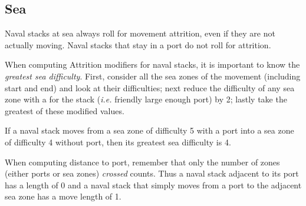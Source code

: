 \subsection{Sea}
Naval stacks at sea always roll for movement attrition, even if they are not
actually moving. Naval stacks that stay in a port do not roll for attrition.

When computing Attrition modifiers for naval stacks, it is important to know
the \emph{greatest sea difficulty}. First, consider all the sea zones of the
movement (including start and end) and look at their difficulties; next reduce
the difficulty of any sea zone with a \SoS for the stack (\emph{i.e.} friendly
large enough port) by 2; lastly take the greatest of these modified values.

\begin{exemple}
  If a naval stack moves from a sea zone of difficulty 5 with a port into a
  sea zone of difficulty 4 without port, then its greatest sea difficulty is
  4.
\end{exemple}

When computing distance to port, remember that only the number of zones
(either ports or sea zones) \emph{crossed} counts. Thus a naval stack adjacent
to its port has a \LoS length of 0 and a naval stack that simply moves from a
port to the adjacent sea zone has a move length of 1.

